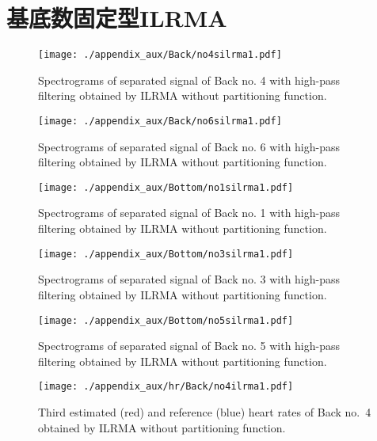 \section{基底数固定型ILRMA}

\begin{figure}[tb]
\centering
\texttt{[image: ./appendix\_aux/Back/no4silrma1.pdf]}
\caption{Spectrograms of separated signal of Back no. 4 with high-pass filtering obtained by ILRMA without partitioning function.}
\end{figure}

\begin{figure}[tb]
\centering
\texttt{[image: ./appendix\_aux/Back/no6silrma1.pdf]}
\caption{Spectrograms of separated signal of Back no. 6 with high-pass filtering obtained by ILRMA without partitioning function.}
\end{figure}

\begin{figure}[tb]
\centering
\texttt{[image: ./appendix\_aux/Bottom/no1silrma1.pdf]}
\caption{Spectrograms of separated signal of Back no. 1 with high-pass filtering obtained by ILRMA without partitioning function.}
\end{figure}

\begin{figure}[tb]
\centering
\texttt{[image: ./appendix\_aux/Bottom/no3silrma1.pdf]}
\caption{Spectrograms of separated signal of Back no. 3 with high-pass filtering obtained by ILRMA without partitioning function.}
\end{figure}

\begin{figure}[tb]
\centering
\texttt{[image: ./appendix\_aux/Bottom/no5silrma1.pdf]}
\caption{Spectrograms of separated signal of Back no. 5 with high-pass filtering obtained by ILRMA without partitioning function.}
\end{figure}

\begin{figure}[tb]
\centering
\texttt{[image: ./appendix\_aux/hr/Back/no4ilrma1.pdf]}
\caption{Third estimated (red) and reference (blue) heart rates of Back no.~4 obtained by ILRMA without partitioning function.}
\end{figure}

